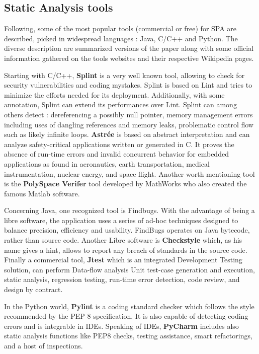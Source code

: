 \subsection{Static Analysis tools}
Following, some of the most popular tools (commercial or free) for SPA are described, picked in widespread languages : Java, C/C++ and Python. The diverse description are summarized versions of the \cite{Gomes2009} paper along with some official information gathered on the tools websites and their respective Wikipedia pages.

Starting with C/C++, \textbf{Splint} is a very well known tool, allowing to check for security vulnerabilities and coding mystakes. Splint is based on Lint and tries to minimize the efforts needed for its deployment. Additionally, with some annotation, Splint can extend its performances over Lint. Splint can among others detect : dereferencing a possibly null pointer, memory management errors including uses of dangling references and memory leaks, problematic control flow such as likely infinite loops. \textbf{Astrée} is based on abstract interpretation and can analyze safety-critical applications written or generated in C. It proves the absence of run-­time errors and invalid concurrent behavior for embedded applications as found in aeronautics, earth transportation, medical instrumentation, nuclear energy, and space flight. Another worth mentioning tool is the \textbf{PolySpace Verifer} tool developed by MathWorks who also created the famous Matlab software. 

Concerning Java, one recognized tool is Findbugs. With the advantage of being a \gls{libre} software, the application uses a series of ad-hoc techniques designed to balance precision, efficiency and usability. FindBugs operates on Java bytecode, rather than source code. Another Libre software is \textbf{Checkstyle} which, as his name gives a hint, allows to report any breach of standards in the source code. Finally a commercial tool, \textbf{Jtest} which is an integrated Development Testing solution, can perform Data-flow analysis Unit test-case generation and execution, static analysis, regression testing, run-time error detection, code review, and design by contract.

In the Python world, \textbf{Pylint} is a coding standard checker which follows the style recommended by the PEP 8 specification. It is also capable of detecting coding errors and is integrable in IDEs. Speaking of IDEs, \textbf{PyCharm} includes also static analysis functions like PEP8 checks, testing assistance, smart refactorings, and a host of inspections.

